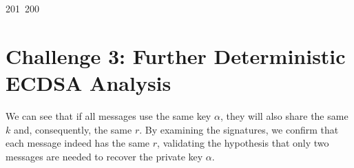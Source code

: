 201~200~\documentclass{article}
\begin{document}
	                                                                        	                                                                    	                                	                    	                    	                        	                        	                    	                                                                	                	                                                                    	                    							                                                                                                                                                                                                    		                                                                                \section{Challenge 3: Further Deterministic ECDSA Analysis}

	                                                                        	                                                                    	                                	                    	                    	                        	                        	                    	                                                                	                	                                                                    	                    							                                                                                                                                                                                                    		                                                                                We can see that if all messages use the same key \( \alpha \), they will also share the same \( k \) and, consequently, the same \( r \). By examining the signatures, we confirm that each message indeed has the same \( r \), validating the hypothesis that only two messages are needed to recover the private key \( \alpha \).
\end{document}
